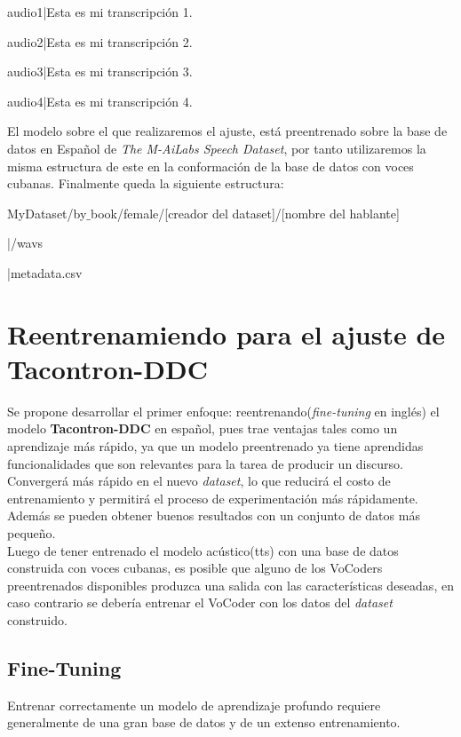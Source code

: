 \begin{center}
	audio1|Esta es mi transcripción 1.
	
	audio2|Esta es mi transcripción 2.
	
	audio3|Esta es mi transcripción 3.
	
	audio4|Esta es mi transcripción 4.
\end{center}

El modelo sobre el que realizaremos el ajuste, está preentrenado sobre la base de datos en Español de \textit{The M-AiLabs Speech Dataset}, por tanto utilizaremos la misma estructura de este en la conformación de la base de datos con voces cubanas. Finalmente queda la siguiente estructura:

\begin{flushleft}
	MyDataset/by$\_$book/female/[creador del dataset]/[nombre del hablante]
	
	|/wavs
	
	|metadata.csv
\end{flushleft}

\section{Reentrenamiendo para el ajuste de Tacontron-DDC}

Se propone desarrollar el primer enfoque: reentrenando(\textit{fine-tuning} en inglés) el modelo \textbf{Tacontron-DDC} en español, pues trae ventajas tales como un aprendizaje más rápido, ya que un modelo preentrenado ya tiene aprendidas funcionalidades que son relevantes para la tarea de producir un discurso. Convergerá más rápido en el nuevo \textit{dataset}, lo que reducirá el costo de entrenamiento y permitirá el proceso de experimentación más rápidamente. Además se pueden obtener buenos resultados con un conjunto de datos más pequeño.\\

Luego de tener entrenado el modelo acústico(tts) con una base de datos construida con voces cubanas, es posible que alguno de los VoCoders preentrenados disponibles produzca una salida con las características deseadas, en caso contrario se debería entrenar el VoCoder con los datos del \textit{dataset} construido.

\subsection{Fine-Tuning}
Entrenar correctamente un modelo de aprendizaje profundo requiere generalmente de una gran base de datos y de un extenso entrenamiento.

